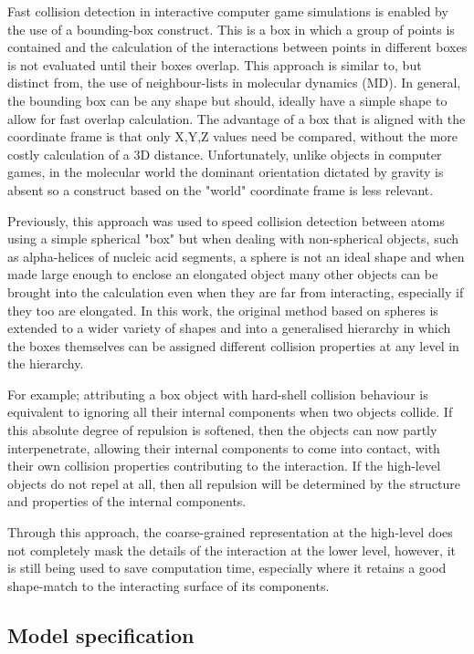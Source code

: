 Fast collision detection in interactive computer game simulations is enabled by the
use of a bounding-box construct.  This is a box in which a group of points is contained
and the calculation of the interactions between points in different boxes is not
evaluated until their boxes overlap.    This approach is similar to, but distinct from,
the use of neighbour-lists in molecular dynamics (MD).   In general, the bounding
box can be any shape but should, ideally have a simple shape to allow for fast
overlap calculation.    The advantage of a box that is aligned with the coordinate
frame is that only X,Y,Z values need be compared, without the more costly calculation
of a 3D distance. Unfortunately, unlike objects in computer games, in the molecular
world the dominant orientation dictated by gravity is absent so a construct based
on the "world" coordinate frame is less relevant.

Previously, this approach was used to speed collision detection
between atoms using a simple spherical "box" \cite{TaylorWRet10a}
but when dealing with non-spherical objects,
such as alpha-helices of nucleic acid segments, a sphere is not an ideal shape and
when made large enough to enclose an elongated object many other objects can be
brought into the calculation even when they are far from interacting, especially if
they too are elongated.   In this work, the original method based on spheres is
extended to a wider variety of shapes and into a generalised hierarchy in which the
boxes themselves can be assigned different collision properties at any level in the
hierarchy. 

For example; attributing a box object with hard-shell collision behaviour is equivalent to
ignoring all their internal components when two objects collide.    If this absolute
degree of repulsion is softened, then the objects can now partly interpenetrate,
allowing their internal components to come into contact, with their own collision
properties contributing to the interaction.   If the high-level objects do not
repel at all, then all repulsion will be determined by the structure and properties of
the internal components.

Through this approach, the coarse-grained representation at the high-level does not
completely mask the details of the interaction at the lower level, however, it is still being
used to save computation time, especially where it retains a good shape-match to the
interacting surface of its components.


\subsection{Model specification}

